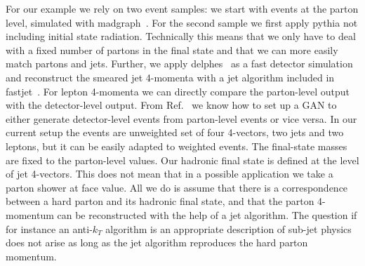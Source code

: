 For our example we rely on two event samples: we start with events at
the parton level, simulated with madgraph~\cite{madgraph}. For
the second sample we first apply pythia not including initial state radiation. Technically this
means that we only have to deal with a fixed number of partons in the
final state and that we can more easily match partons and jets. Further, we apply delphes~\cite{delphes} as a fast detector
simulation and reconstruct the smeared jet 4-momenta with a jet
algorithm included in fastjet~\cite{FastJet}. For lepton 4-momenta we can directly compare the
parton-level output with the detector-level output. From
Ref.~\cite{gan_phasespace} we know how to set up a GAN to either
generate detector-level events from parton-level events or vice
versa. In our current setup the events are unweighted set of four
4-vectors, two jets and two leptons, but it can be easily adapted to
weighted events. The final-state masses are fixed to the parton-level
values. Our hadronic final state is defined at the level of jet
4-vectors. This does not mean that in a possible application we take a
parton shower at face value. All we do is assume that there is a
correspondence between a hard parton and its hadronic final state, and
that the parton 4-momentum can be reconstructed with the help of a jet
algorithm. The question if for instance an anti-$k_T$ algorithm is an
appropriate description of sub-jet physics does not arise as long as
the jet algorithm reproduces the hard parton momentum.

